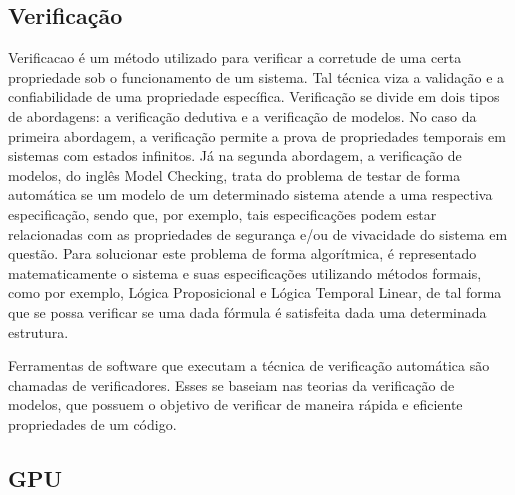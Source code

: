 \subsection{Verificação}
Verificacao é um método utilizado para verificar a corretude de uma certa propriedade sob o funcionamento de um sistema. Tal técnica viza a validação e a confiabilidade de uma propriedade específica. Verificação se divide em dois tipos de abordagens: a verificação dedutiva e a verificação de modelos. No caso da primeira abordagem, a verificação permite a prova de propriedades temporais em sistemas com estados infinitos. Já na segunda abordagem, a verificação de modelos, do inglês Model Checking, trata do problema de testar de forma automática se um modelo de um determinado sistema atende a uma respectiva especificação, sendo que, por exemplo, tais especificações podem estar relacionadas com as propriedades de segurança e/ou de vivacidade do sistema em questão. Para solucionar este problema de forma algorítmica, é representado matematicamente o sistema e suas especificações utilizando métodos formais, como por exemplo, Lógica Proposicional e Lógica Temporal Linear, de tal forma que se possa verificar se uma dada fórmula é satisfeita dada uma determinada estrutura.

Ferramentas de software que executam a técnica de verificação automática são chamadas de verificadores. Esses se baseiam nas teorias da verificação de modelos, que possuem o objetivo de verificar de maneira rápida e eficiente propriedades de um código.

\subsection{GPU}
